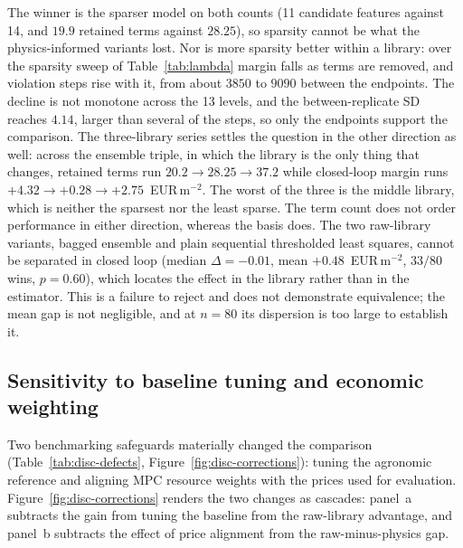 The winner is the sparser model on both counts (11 candidate features against
14, and $19.9$ retained terms against $28.25$), so sparsity cannot be what the
physics-informed variants lost. Nor is more sparsity better within a library:
over the sparsity sweep of Table~\ref{tab:lambda} margin falls as terms are
removed, and violation steps rise with it, from about $3850$ to $9090$ between
the endpoints. The decline is not monotone across the 13 levels, and
the between-replicate SD reaches $4.14$, larger than several of the steps, so
only the endpoints support the comparison. The three-library series settles the
question in the other direction as well: across the ensemble triple, in which the
library is the only thing that changes, retained terms run
$20.2 \rightarrow 28.25 \rightarrow 37.2$ while closed-loop margin runs
$+4.32 \rightarrow +0.28 \rightarrow +2.75$~EUR\,m$^{-2}$. The worst of the three
is the middle library, which is neither the sparsest nor the least sparse.
The term count does not order performance in either direction, whereas the basis
does. The two raw-library variants, bagged ensemble and plain sequential thresholded
least squares, cannot be separated in closed loop (median $\Delta=-0.01$, mean
$+0.48$~EUR\,m$^{-2}$, $33/80$ wins, $p=0.60$), which locates the effect in the
library rather than in the estimator. This is a failure to reject and does not
demonstrate equivalence; the mean gap is not negligible, and at $n=80$ its dispersion
is too large to establish it.

\subsection{Sensitivity to baseline tuning and economic weighting}
\label{sec:disc-defects}

Two benchmarking safeguards materially changed the comparison
(Table~\ref{tab:disc-defects}, Figure~\ref{fig:disc-corrections}): tuning the agronomic
reference and aligning MPC resource weights with the prices used for evaluation.
Figure~\ref{fig:disc-corrections} renders the two changes as cascades: panel~a subtracts
the gain from tuning the baseline from the raw-library advantage, and panel~b subtracts
the effect of price alignment from the raw-minus-physics gap.

